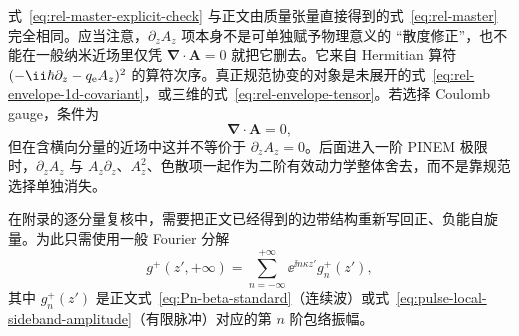 式~\eqref{eq:rel-master-explicit-check} 与正文由质量张量直接得到的式~\eqref{eq:rel-master} 完全相同。应当注意，$\partial_zA_z$ 项本身不是可单独赋予物理意义的 ``散度修正''，也不能在一般纳米近场里仅凭 $\bm\nabla\cdot\bm A=0$ 就把它删去。它来自 Hermitian 算符
\(
(-\ii\hbar\partial_z-q_{\rm e}A_z)^2
\)
的算符次序。真正规范协变的对象是未展开的式~\eqref{eq:rel-envelope-1d-covariant}，或三维的式~\eqref{eq:rel-envelope-tensor}。若选择 Coulomb gauge，条件为
\begin{equation}
\bm\nabla\cdot\bm A=0,
\label{eq:coulomb-gauge}
\end{equation}
但在含横向分量的近场中这并不等价于 $\partial_zA_z=0$。后面进入一阶 PINEM 极限时，$\partial_zA_z$ 与 $A_z\partial_z$、$A_z^2$、色散项一起作为二阶有效动力学整体舍去，而不是靠规范选择单独消失。


在附录的逐分量复核中，需要把正文已经得到的边带结构重新写回正、负能自旋量。为此只需使用一般 Fourier 分解
\begin{equation}
 g^+(z',+\infty)
 =\sum_{n=-\infty}^{+\infty}
 \ee^{\ii n\kappa z'}g_n^+(z'),
 \label{eq:g-sideband-sum}
\end{equation}
其中 $g_n^+(z')$ 是正文式~\eqref{eq:Pn-beta-standard}（连续波）或式~\eqref{eq:pulse-local-sideband-amplitude}（有限脉冲）对应的第 $n$ 阶包络振幅。

